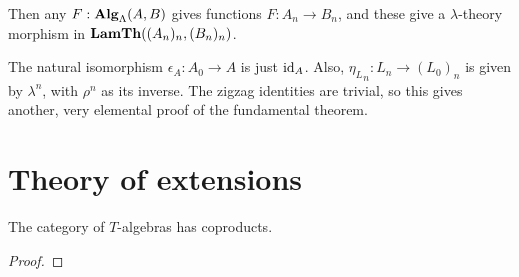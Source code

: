 \begin{remark}
  Then any $ F: \mathbf{Alg}_{\Lambda}(A, B) $ gives functions $ F: A_n \to B_n $, and these give a $ \lambda $-theory morphism in $ \mathbf{LamTh}((A_n)_n, (B_n)_n) $.

  The natural isomorphism $ \epsilon_A: A_0 \to A $ is just $ \text{id}_{A} $. Also, $ {\eta_L}_n : L_n \to (L_0)_n $ is given by $ \lambda^n $, with $ \rho^n $ as its inverse. The zigzag identities are trivial, so this gives another, very elemental proof of the fundamental theorem.
\end{remark}

\section{Theory of extensions}

\begin{lemma}
  The category of $ T $-algebras has coproducts.
\end{lemma}
\begin{proof}
  \TODO
\end{proof}

